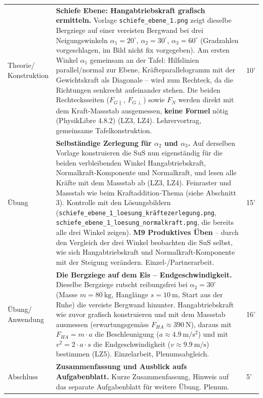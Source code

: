 \documentclass[11pt,a4paper]{article}
\newcommand{\Methode}[1]{{\small\color{groupteal}\textbf{#1}}}
\begin{document}
\begin{xltabular}{\textwidth}{@{}p{2.6cm}X p{1.2cm}@{}}
Theorie/ Konstruktion &
\textbf{Schiefe Ebene: Hangabtriebskraft grafisch ermitteln.} Vorlage
\texttt{schiefe\_ebene\_1.png} zeigt dieselbe Bergziege auf einer
vereisten Bergwand bei drei Neigungswinkeln $\alpha_1{=}20^\circ$,
$\alpha_2{=}30^\circ$, $\alpha_3{=}60^\circ$ (Gradzahlen vorgeschlagen, im Bild
nicht fix vorgegeben). Am ersten Winkel $\alpha_1$ gemeinsam an der Tafel:
Hilfslinien parallel/normal zur Ebene, Kräfteparallelogramm mit der
Gewichtskraft als Diagonale -- wird zum Rechteck, da die Richtungen
senkrecht aufeinander stehen. Die beiden Rechtecksseiten
($F_{G\parallel}$, $F_{G\perp}$) sowie $F_N$ werden direkt mit dem
Kraft-Massstab ausgemessen, \textbf{keine Formel} nötig (PhysikLibre
4.8.2) (LZ3, LZ4). Lehrervortrag, gemeinsame Tafelkonstruktion. &
10' \\[0.4em]

Übung &
\textbf{Selbständige Zerlegung für $\alpha_2$ und $\alpha_3$.} Auf
derselben Vorlage konstruieren die SuS nun eigenständig für die beiden
verbleibenden Winkel Hangabtriebskraft, Normalkraft-Komponente und
Normalkraft, und lesen alle Kräfte mit dem Massstab ab (LZ3, LZ4).
Feinraster und Massstab wie beim Kraftaddition-Thema (siehe Abschnitt 3).
Kontrolle mit den Lösungsbildern
(\texttt{schiefe\_ebene\_1\_loesung\_kräftezerlegung.png},
\texttt{schiefe\_ebene\_1\_loesung\_normalkraft.png}, die bereits alle
drei Winkel zeigen). \Methode{M9 Produktives Üben} -- durch den Vergleich
der drei Winkel beobachten die SuS selbst, wie sich Hangabtriebskraft und
Normalkraft-Komponente mit der Steigung verändern. Einzel-/Partnerarbeit. &
15' \\[0.4em]

Übung/ Anwendung &
\textbf{Die Bergziege auf dem Eis -- Endgeschwindigkeit.} Dieselbe
Bergziege rutscht reibungsfrei bei $\alpha_2{=}30^\circ$ (Masse
$m=\SI{80}{\kilo\gram}$, Hanglänge $s=\SI{10}{\meter}$, Start aus der
Ruhe) die vereiste Bergwand hinunter. Hangabtriebskraft wie zuvor grafisch
konstruieren und mit dem Massstab ausmessen (erwartungsgemäss
$F_{HA}\approx\SI{390}{\newton}$), daraus mit $F_{HA}=m\cdot a$ die
Beschleunigung ($a\approx\SI{4.9}{\meter\per\second\squared}$) und mit
$v^2=2\cdot a\cdot s$ die Endgeschwindigkeit
($v\approx\SI{9.9}{\meter\per\second}$) bestimmen (LZ5). Einzelarbeit,
Plenumsabgleich. &
16' \\[0.4em]

Abschluss &
\textbf{Zusammenfassung und Ausblick aufs Aufgabenblatt.} Kurze
Zusammenfassung, Hinweis auf das separate Aufgabenblatt für weitere
Übung. Plenum. &
5' \\

\bottomrule
\end{xltabular}
\end{document}

